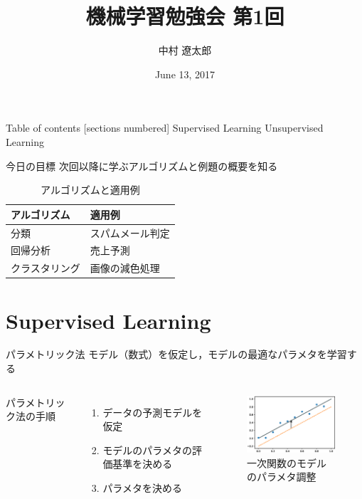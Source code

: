 \documentclass[dvipdfmx,platex]{beamer}
\title{{\mgfamily 機械学習勉強会 第1回}}
\date{June 13, 2017}
\author{{\mgfamily 中村 遼太郎}}
\institute{}
\begin{document}
\mgfamily
\maketitle
\begin{frame}{Table of contents}
  [sections numbered]
  Supervised Learning
  \tableofcontents[part=1]
  Unsupervised Learning
  \tableofcontents[part=2]
\end{frame}
\begin{frame}[fragile]{{\mgfamily 今日の目標}}
  次回以降に学ぶアルゴリズムと例題の概要を知る
  \begin{table}
    \caption{{\mgfamily アルゴリズムと適用例}}
    \begin{tabular}{@{} ll @{}}
      \toprule
      アルゴリズム & 適用例\\
      \midrule
      分類 & スパムメール判定\\
      回帰分析 & 売上予測\\
      クラスタリング & 画像の減色処理\\
      \bottomrule
    \end{tabular}
  \end{table}
\end{frame}
\part{Supervised Learning}
\begin{frame}{パラメトリック法}
  モデル（数式）を仮定し，モデルの最適なパラメタを学習する
  \begin{columns}[T,onlytextwidth]
    パラメトリック法の手順
    \begin{enumerate}
    \item データの予測モデルを仮定
    \item モデルのパラメタの評価基準を決める
    \item パラメタを決める
    \end{enumerate}
    \begin{figure}
      \centering
      \includegraphics[width=5cm]{fig/arrange_params.eps}
      \caption{{\mgfamily 一次関数のモデルのパラメタ調整}}
    \end{figure}
  \end{columns}
\end{frame}
\end{document}
